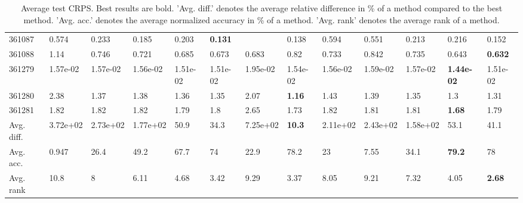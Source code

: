 \begin{table}[ht!]
\begin{tabular}{lllllllllllll}
  361087 & 0.574 & 0.233 & 0.185 & 0.203 & \textbf{0.131} &  & 0.138 & 0.594 & 0.551 & 0.213 & 0.216 & 0.152 \\ 
  361088 & 1.14 & 0.746 & 0.721 & 0.685 & 0.673 & 0.683 & 0.82 & 0.733 & 0.842 & 0.735 & 0.643 & \textbf{0.632} \\ 
  361279 & 1.57e-02 & 1.57e-02 & 1.56e-02 & 1.51e-02 & 1.51e-02 & 1.95e-02 & 1.54e-02 & 1.56e-02 & 1.59e-02 & 1.57e-02 & \textbf{1.44e-02} & 1.51e-02 \\ 
  361280 & 2.38 & 1.37 & 1.38 & 1.36 & 1.35 & 2.07 & \textbf{1.16} & 1.43 & 1.39 & 1.35 & 1.3 & 1.31 \\ 
  361281 & 1.82 & 1.82 & 1.82 & 1.79 & 1.8 & 2.65 & 1.73 & 1.82 & 1.81 & 1.81 & \textbf{1.68} & 1.79 \\ 
   \hline
Avg. diff. & 3.72e+02 & 2.73e+02 & 1.77e+02 & 50.9 & 34.3 & 7.25e+02 & \textbf{10.3} & 2.11e+02 & 2.43e+02 & 1.58e+02 & 53.1 & 41.1 \\ 
  Avg. acc. & 0.947 & 26.4 & 49.2 & 67.7 & 74 & 22.9 & 78.2 & 23 & 7.55 & 34.1 & \textbf{79.2} & 78 \\ 
  Avg. rank & 10.8 & 8 & 6.11 & 4.68 & 3.42 & 9.29 & 3.37 & 8.05 & 9.21 & 7.32 & 4.05 & \textbf{2.68} \\ 
   \hline
\hline
\end{tabular}
\endgroup
\caption{Average test CRPS. 
                  Best results are bold. 
                  'Avg. diff.' denotes the average relative difference in \% of a method compared to the best method.
                  'Avg. acc.' denotes the average normalized accuracy in \% of a method.
                  'Avg. rank' denotes the average rank of a method.} 
\label{TABLES/table_results_CRPS_clustering}
\end{table}
